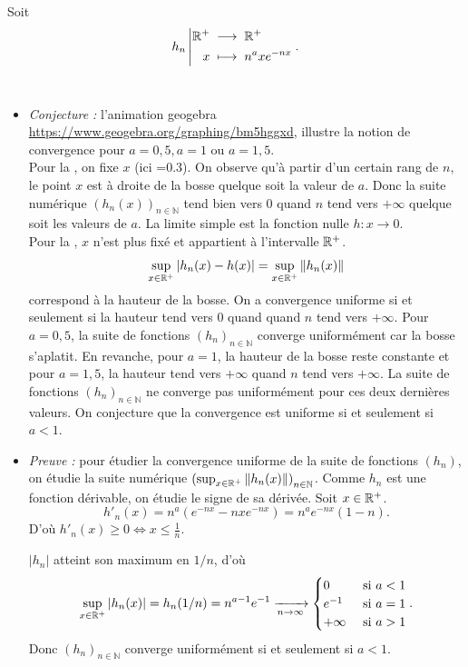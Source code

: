 \documentclass{book}
\begin{document}
\begin{Exemple}[Méthode 1] Soit $${h_n}\left|\begin{aligned}{\mathbb{R}^+}&\;\longrightarrow\;{\mathbb{R} ^+}\\{x}&\;\longmapsto\;{n^a x e^{-nx} }\end{aligned}\right..$$\\
\begin{itemize}
\item \textit{Conjecture :} l'animation geogebra \url{https://www.geogebra.org/graphing/bm5hggxd}, illustre la notion de convergence  pour   $a=0,5, a=1$ ou $a=1,5$. \\
Pour la , on fixe  $x$ (ici =0.3). On observe qu'à partir d'un certain rang de $n$, le point $x$  est à droite de la bosse quelque soit la valeur de $a$. Donc la suite numérique $(h_n(x))_{n\in\mathbb{N}}$ tend bien vers 0 quand $n$ tend vers $+\infty$ quelque soit les valeurs de $a$. La limite simple est la fonction nulle $h:x\to 0.$\\
Pour la , $x$ n'est plus fixé et appartient à l'intervalle $\mathbb{R} ^+$. $$\sup_{x\in \mathbb{R} ^+} \left|h_n(x) - h(x)\right|=\sup_{x\in \mathbb{R} ^+} \|h_n(x)\|$$ correspond à la hauteur de la bosse. On a convergence uniforme si et seulement si la hauteur tend vers $0$ quand quand $n$ tend vers $+\infty$. Pour $a=0,5$, la suite de fonctions $(h_n)_{n\in\mathbb{N}}$ converge uniformément car la bosse s'aplatit. En revanche, pour  $a=1$, la hauteur de la bosse reste constante et pour $a=1,5$, la hauteur tend vers  $+\infty$  quand $n$ tend vers $+\infty$. La suite de fonctions $(h_n)_{n\in\mathbb{N}}$ ne converge pas uniformément pour ces deux dernières valeurs. On conjecture que la convergence est uniforme si et seulement si $a<1$.
\item \textit{Preuve :} pour étudier la convergence uniforme de la suite de fonctions $(h_n)$,  on étudie la suite numérique  $\left(\sup_{x\in  \mathbb{R} ^+} \|h_n(x)\| \right)_{n\in\mathbb{N}}$. Comme $h_n$ est une fonction dérivable, on étudie le signe de sa dérivée. Soit $x\in  \mathbb{R} ^+$. 
$${h'}_n(x)=n^a(e^{-nx}-nxe^{-nx})=n^ae^{-nx}(1-n).$$ D'où ${h'}_n(x)\geq 0 \Leftrightarrow  x\leq \frac 1 n.$  
\begin{center}
\end{center}
$|h_n|$ atteint son maximum en $1/n$, d'où $$\sup_{x\in  \mathbb{R} ^+} \left|h_n(x) \right|=h_n(1/n)=n^{a-1}e^{-1}\xrightarrow[{n\to \infty}]{}\begin{cases} 0 &\text{ si }  a<1\\e^{-1} &\text{ si }  a=1\\+\infty &\text{ si }  a>1 \end{cases}.$$ Donc $(h_n)_{n\in\mathbb{N}}$ converge uniformément si et seulement si   $a<1.$
\end{itemize}
\end{Exemple}
\end{document}
